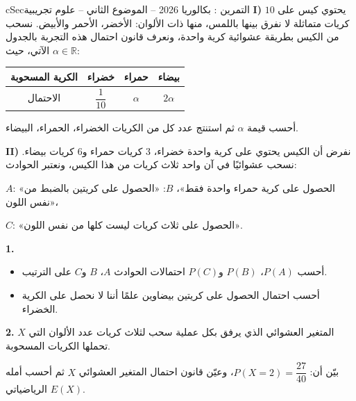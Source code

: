 \documentclass[12pt,a4paper]{article}
\newenvironment{BOX}[2]{\begin{otherlanguage}{english}\begin{arbox}{#1}{#2}}{\end{arbox}\end{otherlanguage}}
\newcounter{exo}
\newenvironment{tamrin}[1]{\stepcounter{exo}\begin{BOX}{cSec}{التمرين \theexo: #1}}{\end{BOX}}
\newcommand{\R}{\mathbb{R}}
\newenvironment{sq}{\begin{itemize}[leftmargin=2.4em,itemsep=3pt]}{\end{itemize}}
\newcommand{\qa}{\item[(أ)]}\newcommand{\qb}{\item[(ب)]}\newcommand{\qc}{\item[(جـ)]}\newcommand{\qd}{\item[(د)]}\newcommand{\qe}{\item[(هـ)]}
\newcommand{\QQ}[1]{\par\smallskip\textbf{#1.} }
\begin{document}
\begin{tamrin}{بكالوريا 2026 -- الموضوع الثاني -- علوم تجريبية}
\textbf{I)} يحتوي كيس على $10$ كريات متماثلة لا نفرق بينها باللمس، منها ذات الألوان: الأخضر، الأحمر والأبيض.
نسحب من الكيس بطريقة عشوائية كرية واحدة، ونعرف قانون احتمال هذه التجربة بالجدول الآتي، حيث $\alpha\in\R$:
\begin{center}
\begin{tabular}{|C|C|C|C|}\hline
{} الكرية المسحوبة & خضراء & حمراء & بيضاء\\\hline
الاحتمال & $\dfrac{1}{10}$ & $\alpha$ & $2\alpha$\\[8pt]\hline
\end{tabular}
\end{center}
أحسب قيمة $\alpha$ ثم استنتج عدد كل من الكريات الخضراء، الحمراء، البيضاء.

\textbf{II)} نفرض أن الكيس يحتوي على كرية واحدة خضراء، $3$ كريات حمراء و$6$ كريات بيضاء.
نسحب عشوائيًا في آن واحد ثلاث كريات من هذا الكيس، ونعتبر الحوادث:

$A$: «الحصول على كرية حمراء واحدة فقط»، \quad $B$: «الحصول على كريتين بالضبط من نفس اللون»،

$C$: «الحصول على ثلاث كريات ليست كلها من نفس اللون».
\QQ{1}
\begin{sq}
\qa أحسب $P(A)$، $P(B)$ و$P(C)$ احتمالات الحوادث $A$، $B$ و$C$ على الترتيب.
\qb أحسب احتمال الحصول على كريتين بيضاوين علمًا أننا لا نحصل على الكرية الخضراء.
\end{sq}
\QQ{2} $X$ المتغير العشوائي الذي يرفق بكل عملية سحب لثلاث كريات عدد الألوان التي تحملها الكريات المسحوبة.

بيّن أن: $P(X=2)=\dfrac{27}{40}$، وعيّن قانون احتمال المتغير العشوائي $X$ ثم أحسب أمله الرياضياتي $E(X)$.
\end{tamrin}
\end{document}
